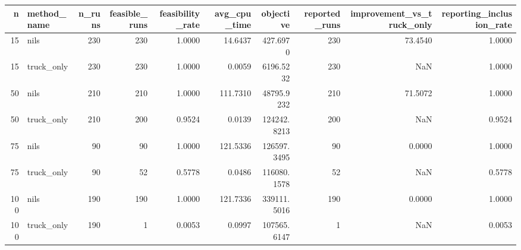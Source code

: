 \begin{tabular}{rlrrrrrrrr}
\toprule
n & method_name & n_runs & feasible_runs & feasibility_rate & avg_cpu_time & objective & reported_runs & improvement_vs_truck_only & reporting_inclusion_rate \\
\midrule
15 & nils & 230 & 230 & 1.0000 & 14.6437 & 427.6970 & 230 & 73.4540 & 1.0000 \\
15 & truck_only & 230 & 230 & 1.0000 & 0.0059 & 6196.5232 & 230 & NaN & 1.0000 \\
50 & nils & 210 & 210 & 1.0000 & 111.7310 & 48795.9232 & 210 & 71.5072 & 1.0000 \\
50 & truck_only & 210 & 200 & 0.9524 & 0.0139 & 124242.8213 & 200 & NaN & 0.9524 \\
75 & nils & 90 & 90 & 1.0000 & 121.5336 & 126597.3495 & 90 & 0.0000 & 1.0000 \\
75 & truck_only & 90 & 52 & 0.5778 & 0.0486 & 116080.1578 & 52 & NaN & 0.5778 \\
100 & nils & 190 & 190 & 1.0000 & 121.7336 & 339111.5016 & 190 & 0.0000 & 1.0000 \\
100 & truck_only & 190 & 1 & 0.0053 & 0.0997 & 107565.6147 & 1 & NaN & 0.0053 \\
\bottomrule
\end{tabular}
